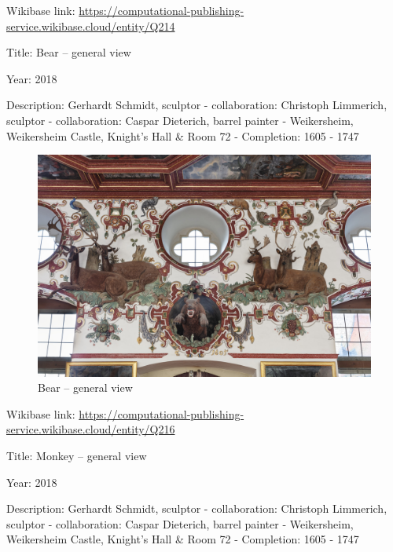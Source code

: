 \documentclass[
  letterpaper,
]{book}
\begin{document}
Wikibase link:
\url{https://computational-publishing-service.wikibase.cloud/entity/Q214}

Title: Bear -- general view

Year: 2018

Description: Gerhardt Schmidt, sculptor - collaboration: Christoph
Limmerich, sculptor - collaboration: Caspar Dieterich, barrel painter -
Weikersheim, Weikersheim Castle, Knight's Hall \& Room 72 - Completion:
1605 - 1747

\begin{figure}[H]

{\centering \includegraphics{impressum_files/mediabag/fmd10005865a.jpg}

}

\caption{Bear -- general view}

\end{figure}%

Wikibase link:
\url{https://computational-publishing-service.wikibase.cloud/entity/Q216}

Title: Monkey -- general view

Year: 2018

Description: Gerhardt Schmidt, sculptor - collaboration: Christoph
Limmerich, sculptor - collaboration: Caspar Dieterich, barrel painter -
Weikersheim, Weikersheim Castle, Knight's Hall \& Room 72 - Completion:
1605 - 1747
\end{document}
